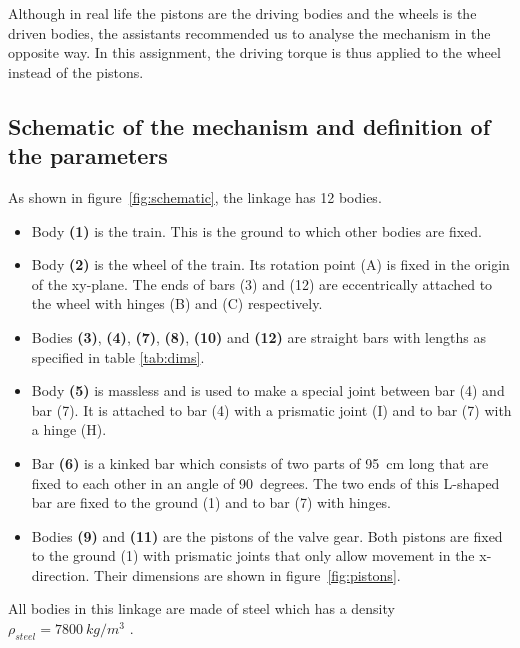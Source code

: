\documentclass[a4paper]{article}
\begin{document}
Although in real life the pistons are the driving bodies and the wheels is the driven bodies, the assistants recommended us to analyse the mechanism in the opposite way. In this assignment, the driving torque is thus applied to the wheel instead of the pistons.

\subsection{Schematic of the mechanism and definition of the parameters}

As shown in figure~\ref{fig:schematic}, the linkage has 12 bodies.

\begin{itemize}
	\item Body \textbf{(1)} is the train. This is the ground to which other bodies are fixed.
	\item Body \textbf{(2)} is the wheel of the train. Its rotation point (A) is fixed in the origin of the xy-plane. The ends of bars (3) and (12) are eccentrically attached to the wheel with hinges (B) and (C) respectively.
	\item Bodies \textbf{(3)}, \textbf{(4)}, \textbf{(7)}, \textbf{(8)}, \textbf{(10)} and \textbf{(12)} are straight bars with lengths as specified in table \ref{tab:dims}.
	\item Body \textbf{(5)} is massless and is used to make a special joint between bar (4) and bar (7). It is attached to bar (4) with a prismatic joint (I) and to bar (7) with a hinge (H).
	\item Bar \textbf{(6)} is a kinked bar which consists of two parts of 95~\si{cm} long that are fixed to each other in an angle of 90~\si{degrees}. The two ends of this L-shaped bar are fixed to the ground (1) and to bar (7) with hinges.
	\item Bodies \textbf{(9)} and \textbf{(11)} are the pistons of the valve gear. Both pistons are fixed to the ground (1) with prismatic joints that only allow movement in the x-direction. Their dimensions are shown in figure~\ref{fig:pistons}.
\end{itemize}

All bodies in this linkage are made of steel which has a density \(\rho_{steel} = 7800~\si{kg/m^3}\) \cite{steel1}.
\end{document}
